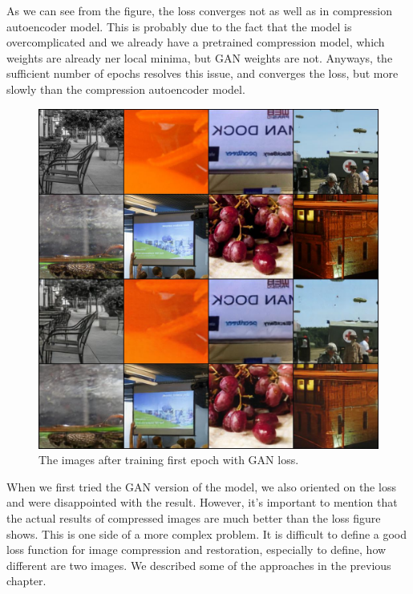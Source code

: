 As we can see from the figure, the loss converges not as well as in compression autoencoder model. This is probably due to the fact that the model is overcomplicated and we already have a pretrained compression model, which weights are already ner local minima, but GAN weights are not. Anyways, the sufficient number of epochs resolves this issue, and converges the loss, but more slowly than the compression autoencoder model.

\begin{figure}
    \centering
    \includegraphics[width=\textwidth]{figure/gan_1000.jpg}
    \caption{The images after training first epoch with GAN loss.}
    \label{gan-first-epoch}
\end{figure}

When we first tried the GAN version of the model, we also oriented on the loss and were disappointed with the result. However, it's important to mention that the actual results of compressed images are much better than the loss figure shows. This is one side of a more complex problem. It is difficult to define a good loss function for image compression and restoration, especially to define, how different are two images. We described some of the approaches in the previous chapter.

